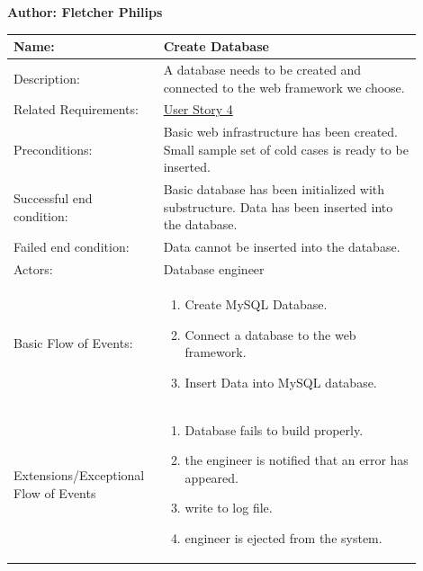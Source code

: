 \documentclass[11pt]{article}
\begin{document}
\begin{table}[!ht]
\begin{center}
\textbf{Author: Fletcher Philips}
\vspace*{1em}

\begin{tabular}{p{0.30\linewidth}p{0.60\linewidth}}
	Name: & Create Database\\\hline
	Description: & A database needs to be created and connected to the web framework we choose.\\\hline
	Related Requirements:& \hyperlink{us4}{User Story 4}\\\hline
	Preconditions:& Basic web infrastructure has been created. Small sample set of cold cases is ready to be inserted.\\\hline
	Successful end condition:& Basic database has been initialized with substructure. Data has been inserted into the database.\\\hline
	Failed end condition:& Data cannot be inserted into the database.\\\hline
	Actors:& Database engineer\\\hline
	Basic Flow of Events: & \begin{enumerate}
	\item Create MySQL Database.
	\item Connect a database to the web framework.
	\item Insert Data into MySQL database.
	\end{enumerate}\\\hline
	Extensions/Exceptional Flow of Events & \begin{enumerate}
	\item Database fails to build properly.
	\item the engineer is notified that an error has appeared.
	\item write to log file.
	\item engineer is ejected from the system.
	\end{enumerate}
\end{tabular}
\label{des:create_database}	
\end{center}
\end{table}
\end{document}
